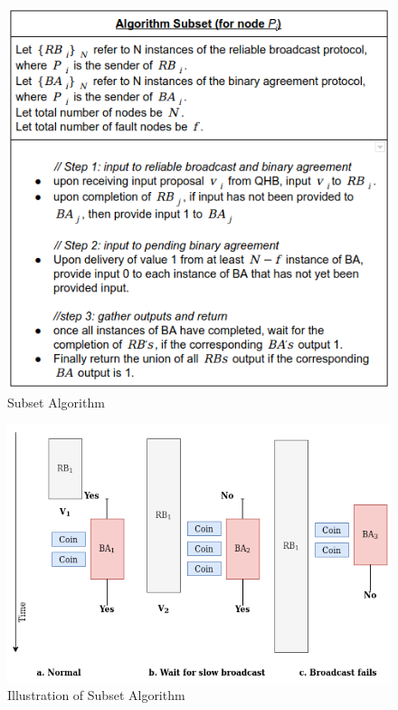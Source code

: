 \begin{figure}[!h]
    \centering
    \includegraphics[scale=0.7]{images/subset_algo.png}
    \caption{Subset Algorithm\cite{miller2016honey}}
    \label{fig:subset_algo}
\end{figure}
\begin{figure}[!h]
    \centering
    \includegraphics[scale=0.7]{images/subset_illust.png}
    \caption{Illustration of Subset Algorithm}
    \label{fig:subset_illust}
\end{figure}
